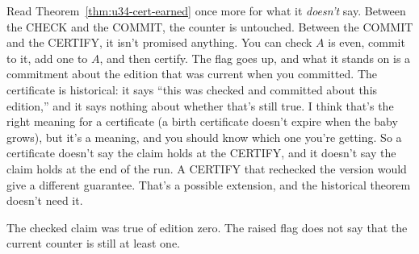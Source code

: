 \documentclass[11pt,twoside]{article}
\theoremstyle{thielethm}
\theoremstyle{thieledef}
\theoremstyle{thieledef}
\theoremstyle{thieledef}
\theoremstyle{thielethm}
\theoremstyle{thieleobs}
\theoremstyle{thielethm}
\begin{document}
Read Theorem~\ref{thm:u34-cert-earned} once more for what it \emph{doesn't} say. Between the CHECK
and the COMMIT, the counter is untouched. Between the COMMIT and the CERTIFY, it isn't
promised anything. You can check $A$ is even, commit to it, add one to $A$, and then
certify. The flag goes up, and what it stands on is a commitment about the edition that was
current when you committed. The certificate is historical: it says ``this was checked and
committed about this edition,'' and it says nothing about whether that's still true. I think
that's the right meaning for a
certificate (a birth certificate doesn't expire when the baby grows), but it's a meaning,
and you should know which one you're getting. So a certificate doesn't say the claim holds at
the CERTIFY, and it doesn't say the claim holds at the end of the run. A CERTIFY that rechecked
the version would give a different guarantee. That's a possible extension, and the historical
theorem doesn't need it.

\begin{center}

\small The checked claim was true of edition zero. The raised flag does not
say that the current counter is still at least one.
\end{center}
\end{document}

